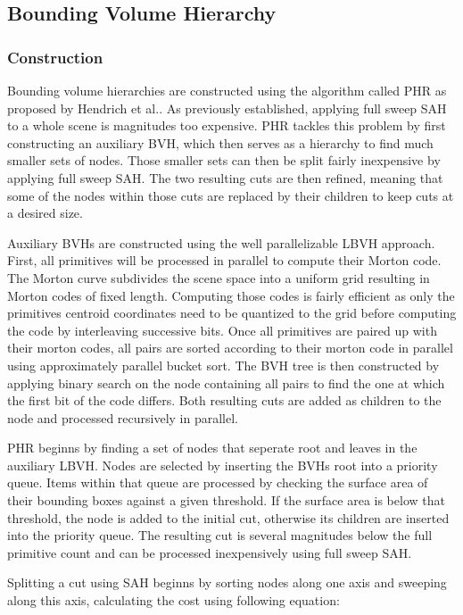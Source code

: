 \subsection{Bounding Volume Hierarchy}
\subsubsection{Construction}
Bounding volume hierarchies are constructed using the algorithm called PHR as proposed by Hendrich et al.\cite{hendrich_parallel_2017}. As previously established, applying full sweep SAH to a whole scene is magnitudes too expensive. PHR tackles this problem by first constructing an auxiliary BVH, which then serves as a hierarchy to find much smaller sets of nodes. Those smaller sets can then be split fairly inexpensive by applying full sweep SAH. The two resulting cuts are then refined, meaning that some of the nodes within those cuts are replaced by their children to keep cuts at a desired size.

Auxiliary BVHs are constructed using the well parallelizable LBVH approach. First, all primitives will be processed in parallel to compute their Morton code. The Morton curve\cite{morton66curve} subdivides the scene space into a uniform grid resulting in Morton codes of fixed length. Computing those codes is fairly efficient as only the primitives centroid coordinates need to be quantized to the grid before computing the code by interleaving successive bits. Once all primitives are paired up with their morton codes, all pairs are sorted according to their morton code in parallel using approximately parallel bucket sort. The BVH tree is then constructed by applying binary search on the node containing all pairs to find the one at which the first bit of the code differs. Both resulting cuts are added as children to the node and processed recursively in parallel.

PHR beginns by finding a set of nodes that seperate root and leaves in the auxiliary LBVH. Nodes are selected by inserting the BVHs root into a priority queue. Items within that queue are processed by checking the surface area of their bounding boxes against a given threshold. If the surface area is below that threshold, the node is added to the initial cut, otherwise its children are inserted into the priority queue. The resulting cut is several magnitudes below the full primitive count and can be processed inexpensively using full sweep SAH.

Splitting a cut using SAH beginns by sorting nodes along one axis and sweeping along this axis, calculating the cost using following equation: %

